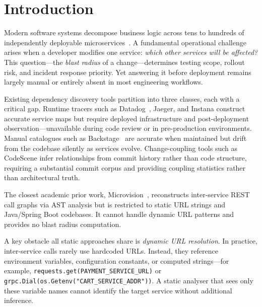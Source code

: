 \documentclass[runningheads]{llncs}
\begin{document}

\section{Introduction}
\label{sec:intro}

Modern software systems decompose business logic across tens to hundreds of
independently deployable microservices~\cite{dragoni2017,fowler2014,newman2021}. A fundamental operational challenge
arises when a developer modifies one service: \emph{which other services
will be affected?} This question---the \emph{blast radius} of a
change---determines testing scope, rollout risk, and incident response
priority. Yet answering it before deployment remains largely manual or
entirely absent in most engineering workflows.

Existing dependency discovery tools partition into three classes, each with
a critical gap. Runtime tracers such as Datadog~\cite{datadog}, Jaeger, and
Instana construct accurate service maps but require deployed infrastructure
and post-deployment observation---unavailable during code review or in
pre-production environments. Manual catalogues such as Backstage~\cite{backstage}
are accurate when maintained but drift from the codebase silently as
services evolve. Change-coupling tools such as CodeScene infer relationships
from commit history rather than code structure, requiring a substantial
commit corpus and providing coupling statistics rather than architectural
truth.

The closest academic prior work, Microvision~\cite{cerny2022}, reconstructs
inter-service REST call graphs via AST analysis but is restricted to static
URL strings and Java/Spring Boot codebases. It cannot handle dynamic URL
patterns and provides no blast radius computation.

A key obstacle all static approaches share is \emph{dynamic URL resolution}.
In practice, inter-service calls rarely use hardcoded URLs. Instead, they
reference environment variables, configuration constants, or computed
strings---for example, \texttt{requests.get(PAYMENT\_SERVICE\_URL)} or
\texttt{grpc.Dial(os.Getenv("CART\_SERVICE\_ADDR"))}. A static analyser
that sees only these variable names cannot identify the target service
without additional inference.
\end{document}
